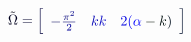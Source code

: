 \documentclass[12pt]{article}
\begin{document}
\makeatletter
\renewcommand*{\@textcolor}[3]{%
  \protect\leavevmode
  \begingroup
    \color#1{#2}#3%
  \endgroup
}
\makeatother
\begin{displaymath}
\mathcolor[RGB]{0,0,15}{\Tilde { \mathcolor[RGB]{0,0,30}{\Omega} } } \mathcolor[RGB]{0,0,45}{=} \mathcolor[RGB]{0,0,60}{\left[} \begin{array} {ccc} \mathcolor[RGB]{0,0,75}{\textstyle} { \mathcolor[RGB]{0,0,90}{-} \mathcolor[RGB]{0,0,105}{\frac { \mathcolor[RGB]{0,0,120}{\pi} ^ { \mathcolor[RGB]{0,0,135}{2} } } { \mathcolor[RGB]{0,0,150}{2} } } } & \mathcolor[RGB]{0,0,165}{\textstyle} { \mathcolor[RGB]{0,0,180}{k} \mathcolor[RGB]{0,0,195}{k} } & \mathcolor[RGB]{0,0,210}{\textstyle} { \mathcolor[RGB]{0,0,225}{2} \mathcolor[RGB]{0,0,240}{(} \mathcolor[RGB]{0,0,255}{\alpha} \mathcolor[RGB]{0,15,0}{-} \mathcolor[RGB]{0,15,15}{k} \mathcolor[RGB]{0,15,30}{)} } \end{array} \mathcolor[RGB]{0,15,45}{\right]}
\end{displaymath}
\end{document}
